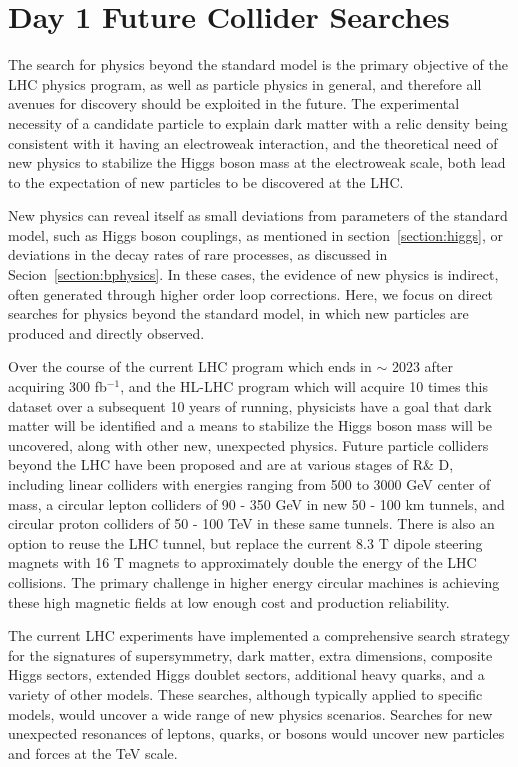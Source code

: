 \section{Day 1 Future Collider Searches}\label{section:searches}

The search for physics beyond the standard model is the primary objective of the LHC physics program, as well as particle physics in general, and therefore all avenues for discovery should be exploited in the future.  The experimental necessity of a candidate particle to explain dark matter with a relic density being consistent with it having an electroweak interaction, and the theoretical need of new physics to stabilize the Higgs boson mass at the electroweak scale, both lead to the expectation of new particles to be discovered at the LHC.   

New physics can reveal itself as small deviations from parameters of the standard model, such as Higgs boson couplings, as mentioned in section~\ref{section:higgs}, or deviations in the decay rates of rare processes, as discussed in Secion~\ref{section:bphysics}.  In these cases, the evidence of new physics is indirect, often generated through higher order loop corrections.   Here, we focus on direct searches for physics beyond the standard model, in which new particles are produced and directly observed.

Over the course of the current LHC program which ends in $\sim$ 2023 after acquiring 300 fb$^{-1}$, and the HL-LHC program which will acquire 10 times this dataset over a subsequent 10 years of running, physicists have a goal that dark matter will be identified and a means to stabilize the Higgs boson mass will be uncovered, along with other new, unexpected physics.  Future particle colliders beyond the LHC have been proposed and are at various stages of R\& D, including linear colliders with energies ranging from 500 to 3000 GeV center of mass, a circular lepton colliders of 90 - 350 GeV in new 50 - 100 km tunnels, and circular proton colliders of 50 - 100 TeV in these same tunnels.  There is also an option to reuse the LHC tunnel, but replace the current 8.3 T dipole steering magnets with 16 T magnets to approximately double the energy of the LHC collisions.   The primary challenge in higher energy circular machines is achieving these high magnetic fields at low enough cost and production reliability. 

The current LHC experiments have implemented a comprehensive search strategy for the signatures of supersymmetry, dark matter, extra dimensions, composite Higgs sectors, extended Higgs doublet sectors, additional heavy quarks, and a variety of other models.  These searches, although typically applied to specific models, would uncover a wide range of new physics scenarios.  Searches for new unexpected resonances of leptons, quarks, or bosons would uncover new particles and forces at the TeV scale.  

